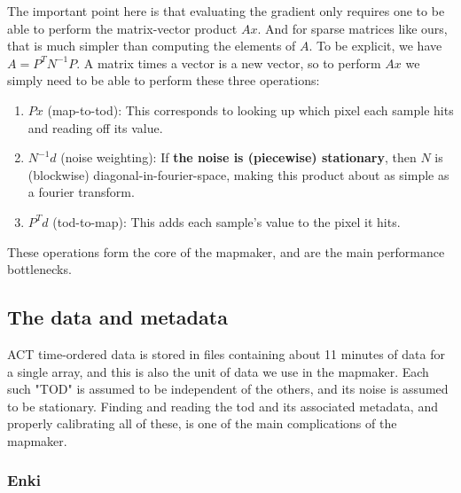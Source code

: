 \documentclass[a4paper, 11pt]{article}
\newcommand{\assume}[1]{{\bf#1}}
\begin{document}
The important point here is that evaluating the gradient only requires one to
be able to perform the matrix-vector product $Ax$. And for sparse matrices like
ours, that is much simpler than computing the elements of $A$. To be explicit,
we have $A = P^TN^{-1}P$. A matrix times a vector is a new vector, so to
perform $Ax$ we simply need to be able to perform these three operations:
\begin{enumerate}
	\item $Px$ (map-to-tod): This corresponds to looking up which pixel each sample hits and reading off its value.
	\item $N^{-1}d$ (noise weighting): If \assume{the noise is (piecewise) stationary},
		then $N$ is (blockwise) diagonal-in-fourier-space, making this product
		about as simple as a fourier transform.
	\item $P^Td$ (tod-to-map): This adds each sample's value to the pixel it hits.
\end{enumerate}
These operations form the core of the mapmaker, and are the main performance bottlenecks.

\subsection{The data and metadata}
ACT time-ordered data is stored in files containing about 11 minutes of data for a single
array, and this is also the unit of data we use in the mapmaker. Each such "TOD" is assumed
to be independent of the others, and its noise is assumed to be stationary. Finding and
reading the tod and its associated metadata, and properly calibrating all of these, is one
of the main complications of the mapmaker.

\subsubsection{Enki}
\end{document}
